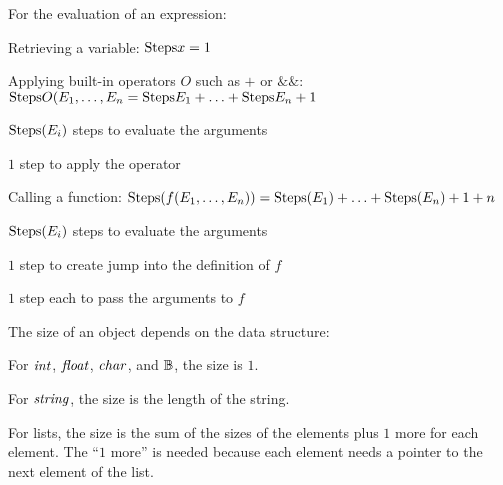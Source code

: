 \begin{example}
For the evaluation of an expression:
\begin{compactitem}
 \item Retrieving a variable: $\mathrm{Steps}{x}=1$
 \item Applying built-in operators $O$ such as $+$ or $\&\&$: $\mathrm{Steps}{O(E_1,\ldots, E_n}=\mathrm{Steps}{E_1}+\ldots+\mathrm{Steps}{E_n}+1$
  \begin{compactitem}
    \item $\mathrm{Steps}(E_i)$ steps to evaluate the arguments
    \item $1$ step to apply the operator
  \end{compactitem}  
 \item Calling a function: $\mathrm{Steps}(f(E_1,\ldots,E_n))=\mathrm{Steps}(E_1)+\ldots+\mathrm{Steps}(E_n)+1+n$
  \begin{compactitem}
    \item $\mathrm{Steps}(E_i)$ steps to evaluate the arguments
    \item $1$ step to create jump into the definition of $f$
    \item $1$ step each to pass the arguments to $f$
  \end{compactitem}
\end{compactitem}

The size of an object depends on the data structure:
\begin{compactitem}
  \item For $\mathit{int}$, $\mathit{float}$, $\mathit{char}$, and $\mathbb{B}$, the size is $1$.
  \item For $\mathit{string}$, the size is the length of the string.
  \item For lists, the size is the sum of the sizes of the elements plus $1$ more for each element.
   The ``$1$ more'' is needed because each element needs a pointer to the next element of the list.
\end{compactitem}
\end{example}

